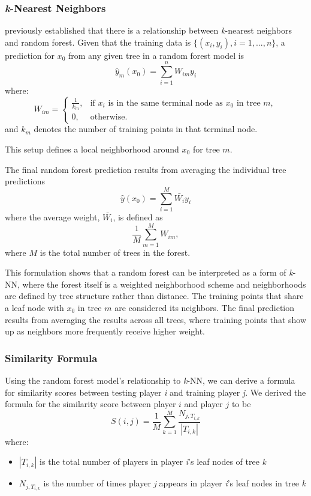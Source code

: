 \documentclass{article}
\begin{document}
\subsubsection{\textit{k}-Nearest Neighbors}

\citet{lin_random_2006} previously established that there is a relationship between \textit{k}-nearest neighbors and random forest. Given that the training data is $\{(x_i,y_i),i=1, ...,n\}$, a prediction for $x_0$ from any given tree in a random forest model is $$\hat{y}_m(x_0)=\sum_{i=1}^{n}W_{im}y_i$$
where:
\[W_{im} = 
\begin{cases}
\frac{1}{k_m}, & \text{if } x_i \text{ is in the same terminal node as } x_0 \text{ in tree } m, \\
0, & \text{otherwise}.
\end{cases} 
\]
and $k_m$ denotes the number of training points in that terminal node. 

This setup defines a local neighborhood around $x_0$ for tree $m$.

The final random forest prediction results from averaging the individual tree predictions $$\hat{y}(x_0)=\sum_{i=1}^M\bar{W_i}y_i$$
where the average weight, $\bar{W_i}$, is defined as $$\frac{1}{M}\sum_{m=1}^MW_{im},$$ where $M$ is the total number of trees in the forest.  

This formulation shows that a random forest can be interpreted as a form of \textit{k}-NN, where the forest itself is a weighted neighborhood scheme and neighborhoods are defined by tree structure rather than distance. The training points that share a leaf node with $x_0$ in tree $m$ are considered its neighbors. The final prediction results from averaging the results across all trees, where training points that show up as neighbors more frequently receive higher weight. 

\subsubsection{Similarity Formula}
Using the random forest model's relationship to \textit{k}-NN, we can derive a formula for similarity scores between testing player \textit{i} and training player \textit{j}. We derived the formula for the similarity score between player $i$ and player $j$ to be
$$S(i,j) = \frac{1}{M}\sum_{k=1}^{M}{\frac{N_{j,T_{i,k}}}{|T_{i,k}|}}$$
where:
\begin{itemize}
    \item $|T_{i,k}|$ is the total number of players in player \textit{i}'s leaf nodes of tree \textit{k} 
    \item $N_{j,T_{i,k}}$ is the number of times player \textit{j} appears in player \textit{i}'s leaf nodes in tree \textit{k}
\end{itemize}
\end{document}
